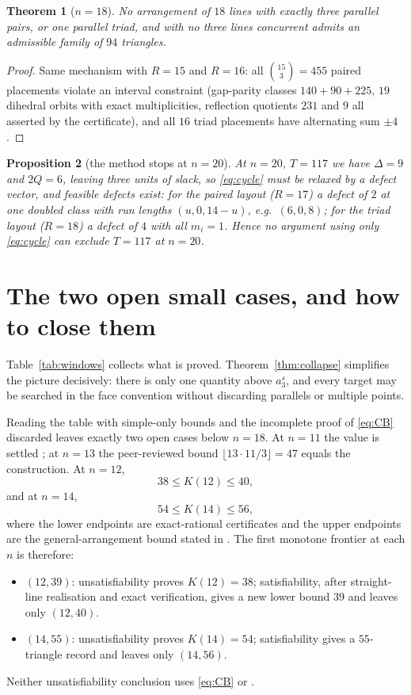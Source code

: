 \documentclass[11pt]{article}
\newtheorem{theorem}{Theorem}
\newtheorem{proposition}[theorem]{Proposition}
\theoremstyle{definition}
\begin{document}
\begin{theorem}[$n=18$]\label{thm:M18}
No arrangement of $18$ lines with exactly three parallel pairs, or one
parallel triad, and with no three lines concurrent admits an admissible
family of $94$ triangles.
\end{theorem}

\begin{proof}
Same mechanism with $R=15$ and $R=16$: all $\binom{15}{3}=455$ paired
placements violate an interval constraint (gap-parity classes $140+90+225$,
$19$ dihedral orbits with exact multiplicities, reflection quotients $231$
and $9$ all asserted by the certificate), and all $16$ triad placements have
alternating sum $\pm4$.
\end{proof}
\begin{proposition}[the method stops at $n=20$]\label{prop:n20}
At $n=20$, $T=117$ we have $\Delta=9$ and $2Q=6$, leaving three units of
slack, so \eqref{eq:cycle} must be relaxed by a defect vector, and feasible
defects exist: for the paired layout ($R=17$) a defect of $2$ at one doubled
class with run lengths $(u,0,14-u)$, e.g.\ $(6,0,8)$; for the triad layout
($R=18$) a defect of $4$ with all $m_i=1$. Hence no argument using only
\eqref{eq:cycle} can exclude $T=117$ at $n=20$.
\end{proposition}

\section{The two open small cases, and how to close them}

Table~\ref{tab:windows} collects what is proved. Theorem~\ref{thm:collapse}
simplifies the picture decisively: there is only one quantity above
$a_3^s$, and every target may be searched in the face convention without
discarding parallels or multiple points.

Reading the table with simple-only bounds and the incomplete proof of
\eqref{eq:CB} discarded leaves exactly two open cases below $n=18$. At
$n=11$ the value is settled \cite{Savchuk}; at $n=13$ the peer-reviewed
bound $\lfloor13\cdot11/3\rfloor=47$ equals the construction. At $n=12$,
\[
 38\le K(12)\le40,
\]
and at $n=14$,
\[
 54\le K(14)\le56,
\]
where the lower endpoints are exact-rational certificates and the upper
endpoints are the general-arrangement bound stated in \cite{FK1999}. The
first monotone frontier at each $n$ is therefore:
\begin{itemize}
\item $(12,39)$: unsatisfiability proves $K(12)=38$; satisfiability, after
straight-line realisation and exact verification, gives a new lower bound
$39$ and leaves only $(12,40)$.
\item $(14,55)$: unsatisfiability proves $K(14)=54$; satisfiability gives a
$55$-triangle record and leaves only $(14,56)$.
\end{itemize}
Neither unsatisfiability conclusion uses \eqref{eq:CB} or \cite{FK1999}.
\end{document}
